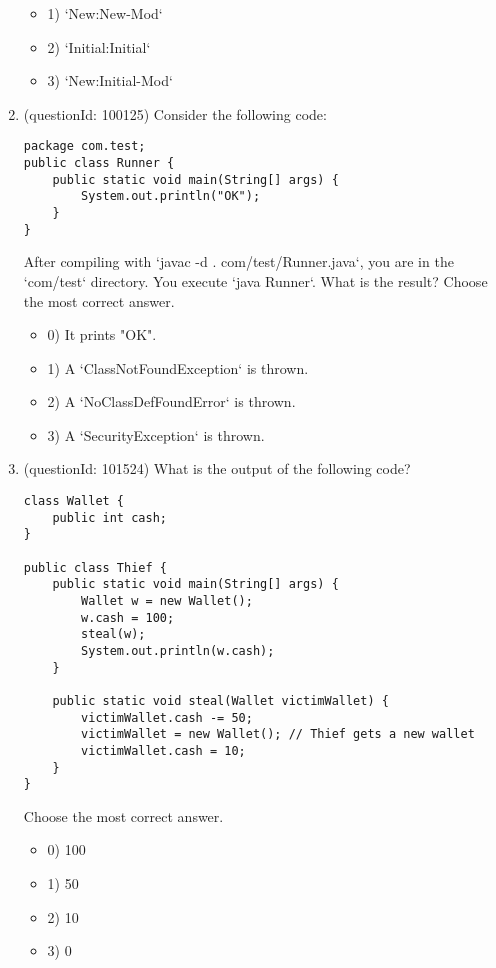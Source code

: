 \documentclass[12pt]{article}
\begin{document}
\begin{enumerate}[label=(\arabic*)]
\begin{itemize}
\item 1) `New:New-Mod`

\item 2) `Initial:Initial`

\item 3) `New:Initial-Mod`

\end{itemize}
\item (questionId: 100125) Consider the following code:
\begin{verbatim}
package com.test;
public class Runner {
    public static void main(String[] args) {
        System.out.println("OK");
    }
}
\end{verbatim}
After compiling with `javac -d . com/test/Runner.java`, you are in the `com/test` directory. You execute `java Runner`. What is the result?
Choose the most correct answer. 
\begin{itemize}
\item 0) It prints "OK".

\item 1) A `ClassNotFoundException` is thrown.

\item 2) A `NoClassDefFoundError` is thrown.

\item 3) A `SecurityException` is thrown.

\end{itemize}
\item (questionId: 101524) What is the output of the following code?\n\begin{verbatim}
class Wallet {
    public int cash;
}

public class Thief {
    public static void main(String[] args) {
        Wallet w = new Wallet();
        w.cash = 100;
        steal(w);
        System.out.println(w.cash);
    }

    public static void steal(Wallet victimWallet) {
        victimWallet.cash -= 50;
        victimWallet = new Wallet(); // Thief gets a new wallet
        victimWallet.cash = 10;
    }
}
\end{verbatim}
Choose the most correct answer. 
\begin{itemize}
\item 0) 100

\item 1) 50

\item 2) 10

\item 3) 0


\end{itemize}
\end{enumerate}
\end{document}

